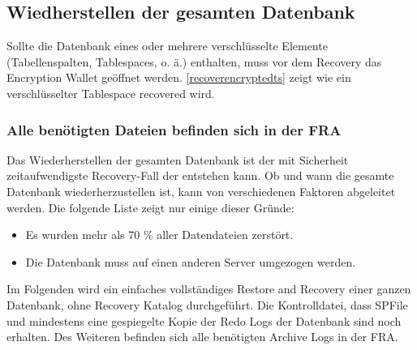     \subsection{Wiedherstellen der gesamten Datenbank}
      \begin{merke}
        Sollte die Datenbank eines oder mehrere verschlüsselte Elemente (Tabellenspalten, Tablespaces, o. ä.) enthalten, muss vor dem Recovery das Encryption Wallet geöffnet werden. \ref{recoverencryptedts} zeigt wie ein verschlüsselter Tablespace recovered wird.
      \end{merke}
\clearpage
      \subsubsection{Alle benötigten Dateien befinden sich in der FRA}
        Das Wiederherstellen der gesamten Datenbank ist der mit Sicherheit zeitaufwendigste Recovery-Fall der entstehen kann. Ob und wann die gesamte Datenbank wiederherzustellen ist, kann von verschiedenen Faktoren abgeleitet werden. Die folgende Liste zeigt nur einige dieser Gründe:
        \begin{itemize}
          \item Es wurden mehr als 70 \% aller Datendateien zerstört.
          \item Die Datenbank muss auf einen anderen Server umgezogen werden.
        \end{itemize}
        Im Folgenden wird ein einfaches vollständiges Restore and Recovery einer ganzen Datenbank, ohne Recovery Katalog durchgeführt. Die Kontrolldatei, dass SPFile und mindestens eine gespiegelte Kopie der Redo Logs der Datenbank sind noch erhalten. Des Weiteren befinden sich alle benötigten Archive Logs in der FRA.
